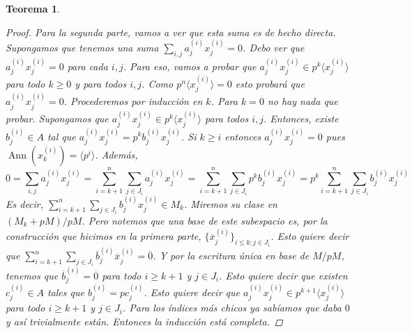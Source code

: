 \documentclass[12pt]{book}
\newtheorem{teo}{Teorema}[section]
\theoremstyle{definition}
\DeclareMathOperator{\ann}{Ann}
\begin{document}
\begin{teo}
\begin{proof}
Para la segunda parte, vamos a ver que esta suma es de hecho directa. Supongamos que tenemos una suma $\displaystyle\sum_{i,j}a_j^{(i)}x_j^{(i)}=0$. Debo ver que $a_j^{(i)}x_j^{(i)}=0$ para cada $i,j$. Para eso, vamos a probar que $a_j^{(i)}x_j^{(i)}\in p^k \langle x_j^{(i)}\rangle$ para todo $k\geq 0$ y para todos $i,j$. Como $p^n\langle x_j^{(i)}\rangle=0$ esto probará que $a_j^{(i)}x_j^{(i)}=0$. Procederemos por inducción en $k$. Para $k=0$ no hay nada que probar. Supongamos que $a_j^{(i)}x_j^{(i)}\in p^k \langle x_j^{(i)}\rangle$ para todos $i,j$. Entonces, existe $b_j^{(i)}\in A$ tal que $a_j^{(i)}x_j^{(i)} = p^k b_j^{(i)}x_j^{(i)}$. Si $k\geq i$ entonces $a_j^{(i)}x_j^{(i)}=0$ pues $\ann(x_k^{(i)}) = \langle p^i\rangle$. Además, $$0 = \displaystyle\sum_{i,j}a_j^{(i)}x_j^{(i)} = \displaystyle\sum_{i=k+1}^n \sum_{j\in J_i} a_j^{(i)}x_j^{(i)} = \displaystyle\sum_{i=k+1}^n \sum_{j\in J_i} p^k b_j^{(i)}x_j^{(i)} = p^k \displaystyle\sum_{i=k+1}^n\sum_{j\in J_i} b_j^{(i)}x_j^{(i)} $$ Es decir, $\displaystyle\sum_{i=k+1}^n \sum_{j\in J_i}b_j^{(i)}x_j^{(i)}\in M_k$. Miremos su clase en $(M_k + pM)/pM$. Pero notemos que una base de este subespacio es, por la construcción que hicimos en la primera parte, $\{\overline{x}_j^{(i)}\}_{i\leq k; j\in J_i}$. Esto quiere decir que $\displaystyle\sum_{i=k+1}^n \sum_{j\in J_i} \overline{b}_j^{(i)}\overline{x}_j^{(i)}=\overline{0}$. Y por la escritura única en base de $M/pM$, tenemos que $\overline{b}_{j}^{(i)}=\overline{0}$ para todo $i\geq k+1$ y $j\in J_i$. Esto quiere decir que existen $c_j^{(i)}\in A$ tales que $b_j^{(i)}=pc_j^{(i)}$. Esto quiere decir que $a_j^{(i)}x_j^{(i)}\in p^{k+1}\langle x_j^{(i)}\rangle$ para todo $i\geq k+1$ y $j\in J_i$. Para los índices más chicos ya sabíamos que daba $0$ y así trivialmente están. Entonces la inducción está completa.


\end{proof}
\end{teo}
\end{document}
